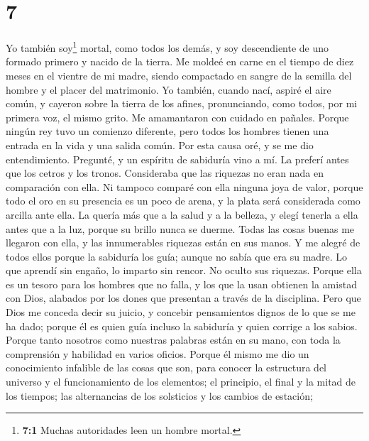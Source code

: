 \hypertarget{section-6}{%
\section{7}\label{section-6}}

 Yo también soy\footnote{\textbf{7:1} Muchas autoridades
  leen un hombre mortal.} mortal, como todos los demás, y soy
descendiente de uno formado primero y nacido de la tierra.
 Me moldeé en carne en el tiempo de diez meses en el
vientre de mi madre, siendo compactado en sangre de la semilla del
hombre y el placer del matrimonio.  Yo también, cuando
nací, aspiré el aire común, y cayeron sobre la tierra de los afines,
pronunciando, como todos, por mi primera voz, el mismo grito.
 Me amamantaron con cuidado en pañales. 
Porque ningún rey tuvo un comienzo diferente,  pero todos
los hombres tienen una entrada en la vida y una salida común.
 Por esta causa oré, y se me dio entendimiento. Pregunté,
y un espíritu de sabiduría vino a mí.  La preferí antes
que los cetros y los tronos. Consideraba que las riquezas no eran nada
en comparación con ella.  Ni tampoco comparé con ella
ninguna joya de valor, porque todo el oro en su presencia es un poco de
arena, y la plata será considerada como arcilla ante ella.
 La quería más que a la salud y a la belleza, y elegí
tenerla a ella antes que a la luz, porque su brillo nunca se duerme.
 Todas las cosas buenas me llegaron con ella, y las
innumerables riquezas están en sus manos.  Y me alegré de
todos ellos porque la sabiduría los guía; aunque no sabía que era su
madre.  Lo que aprendí sin engaño, lo imparto sin rencor.
No oculto sus riquezas.  Porque ella es un tesoro para
los hombres que no falla, y los que la usan obtienen la amistad con
Dios, alabados por los dones que presentan a través de la disciplina.
 Pero que Dios me conceda decir su juicio, y concebir
pensamientos dignos de lo que se me ha dado; porque él es quien guía
incluso la sabiduría y quien corrige a los sabios. 
Porque tanto nosotros como nuestras palabras están en su mano, con toda
la comprensión y habilidad en varios oficios.  Porque él
mismo me dio un conocimiento infalible de las cosas que son, para
conocer la estructura del universo y el funcionamiento de los elementos;
 el principio, el final y la mitad de los tiempos; las
alternancias de los solsticios y los cambios de estación;
